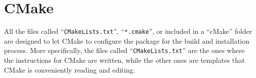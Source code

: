 \section{CMake}
\label{ss:structure::cmake}
%
All the files called ``\texttt{CMakeLists.txt}'', ``\texttt{*.cmake}'', or 
included in a ``cMake'' folder are designed to let CMake to configure the 
package for the build and installation process.
%
More specifically, the files called ``\texttt{CMakeLists.txt}'' are the ones 
where the instructions for CMake are written, while the other ones are 
templates that CMake is conveniently reading and editing.
